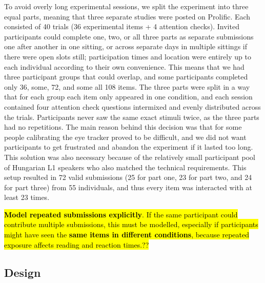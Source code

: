 \documentclass[a4paper, ruler]{CUP-JNL-LIN}%
\begin{document}
To avoid overly long experimental sessions, we split the experiment into three equal parts, meaning that three separate studies were posted on Prolific. Each consisted of 40 trials (36 experimental items + 4 attention checks). Invited participants could complete one, two, or all three parts as separate submissions one after another in one sitting, or across separate days in multiple sittings if there were open slots still; participation times and location were entirely up to each individual according to their own convenience. This means that we had three participant groups that could overlap, and some participants completed only 36, some, 72, and some all 108 items. The three parts were split in a way that for each group each item only appeared in one condition, and each session contained four attention check questions intermixed and evenly distributed across the trials. Participants never saw the same exact stimuli twice, as the three parts had no repetitions. The main reason behind this decision was that for some people calibrating the eye tracker proved to be difficult, and we did not want participants to get frustrated and abandon the experiment if it lasted too long. This solution was also necessary because of the relatively small participant pool of Hungarian L1 speakers who also matched the technical requirements. This setup resulted in 72 valid submissions (25 for part one, 23 for part two, and 24 for part three) from 55 individuals, and thus every item was interacted with at least 23 times. 

\hl{ \bigstar \textbf{Model repeated submissions explicitly}. If the same participant could contribute multiple submissions, this must be modelled, especially if participants might have seen the \textbf{same items in different conditions}, because repeated exposure affects reading and reaction times.??}



\subsection{Design}
\end{document}
